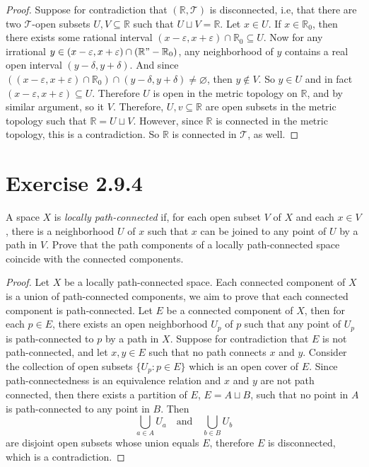 \documentclass[12pt]{article}
\newenvironment{problem}
    {\begin{lrbox}{\mybox}\begin{minipage}{\textwidth-10pt}}
    {\end{minipage}\end{lrbox}\framebox[6.5in]{\usebox{\mybox}}}
\newcommand{\isp}[1]{\quad\text{#1}\quad}
\newcommand{\R}{\mathbb{R}}
\let\eps\varepsilon
\let\emptyset\varnothing
\newcommand{\T}{\mathscr{T}}
\begin{document}
\begin{proof}
    Suppose for contradiction that $(\R,\T)$ is disconnected, i.e, that there are two $\T$-open subsets $U,V\subseteq \R$ such that $U\sqcup V = \R$. Let $x\in U$. If $x\in\R_0$, then there exists some rational interval $(x-\eps,x+\eps)\cap\R_0 \subseteq U$. Now for any irrational $y\in(x-\eps,x+\eps)\cap(\R"-\R_0)$, any neighborhood of $y$ contains a real open interval $(y-\delta,y+\delta)$. And since $((x-\eps,x+\eps)\cap\R_0)\cap(y-\delta,y+\delta) \ne \emptyset$, then $y\notin V$. So $y\in U$ and in fact $(x-\eps,x+\eps)\subseteq U$. Therefore $U$ is open in the metric topology on $\R$, and by similar argument, so it $V$. Therefore, $U,v\subseteq\R$ are open subsets in the metric topology such that $\R=U\sqcup V$. However, since $\R$ is connected in the metric topology, this is a contradiction. So $\R$ is connected in $\T$, as well.
    
\end{proof}

\section*{Exercise 2.9.4}
\begin{problem}
    A space $X$ is \emph{locally path-connected} if, for each open subset $V$ of $X$ and each $x\in V$, there is a neighborhood $U$ of $x$ such that $x$ can be joined to any point of $U$ by a path in $V$. Prove that the path components of a locally path-connected space coincide with the connected components.
\end{problem}

\begin{proof}
    Let $X$ be a locally path-connected space. Each connected component of $X$ is a union of path-connected components, we aim to prove that each connected component is path-connected. Let $E$ be a connected component of $X$, then for each $p\in E$, there exists an open neighborhood $U_p$ of $p$ such that any point of $U_p$ is path-connected to $p$ by a path in $X$. Suppose for contradiction that $E$ is not path-connected, and let $x,y\in E$ such that no path connects $x$ and $y$. Consider the collection of open subsets $\{U_p : p\in E\}$ which is an open cover of $E$. Since path-connectedness is an equivalence relation and $x$ and $y$ are not path connected, then there exists a partition of $E$, $E=A\sqcup B$, such that no point in $A$ is path-connected to any point in $B$. Then 
    \[\bigcup_{a\in A}U_a \isp{and} \bigcup_{b\in B}U_b\]
    are disjoint open subsets whose union equals $E$, therefore $E$ is disconnected, which is a contradiction.
    
\end{proof}
\end{document}

